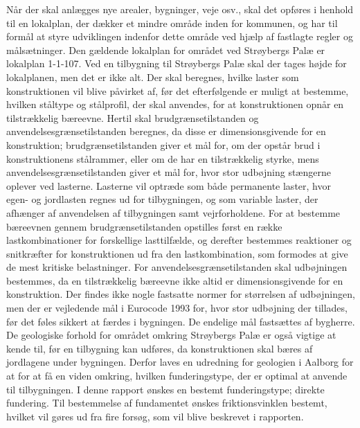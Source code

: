 \indent{     }  Når der skal anlægges nye arealer, bygninger, veje osv., skal det opføres i henhold til en lokalplan, der dækker et mindre område inden for kommunen, og har til formål at styre udviklingen indenfor dette område ved hjælp af fastlagte regler og målsætninger. Den gældende lokalplan for området ved Strøybergs Palæ er lokalplan 1-1-107.
\newline
\newline
Ved en tilbygning til Strøybergs Palæ skal der tages højde for lokalplanen, men det er ikke alt. Der skal beregnes, hvilke laster som konstruktionen vil blive påvirket af, før det efterfølgende er muligt at bestemme, hvilken ståltype og stålprofil, der skal anvendes, for at konstruktionen opnår en tilstrækkelig bæreevne. Hertil skal brudgrænsetilstanden og anvendelsesgrænsetilstanden beregnes, da disse er dimensionsgivende for en konstruktion; brudgrænsetilstanden giver et mål for, om der opstår brud i konstruktionens stålrammer, eller om de har en tilstrækkelig styrke, mens anvendelsesgrænsetilstanden giver et mål for, hvor stor udbøjning stængerne oplever ved lasterne. 
\newline \indent{     }  Lasterne vil optræde som både permanente laster, hvor egen- og jordlasten regnes ud for tilbygningen, og som variable laster, der afhænger af anvendelsen af tilbygningen samt vejrforholdene.
\newline \indent{     }  For at bestemme bæreevnen gennem brudgrænsetilstanden opstilles først en række lastkombinationer for forskellige lasttilfælde, og derefter bestemmes reaktioner og snitkræfter for konstruktionen ud fra den lastkombination, som formodes at give de mest kritiske belastninger. 
\newline \indent{     }  For anvendelsesgrænsetilstanden skal udbøjningen bestemmes, da en tilstrækkelig bæreevne ikke altid er dimensionsgivende for en konstruktion. Der findes ikke nogle fastsatte normer for størrelsen af udbøjningen, men der er vejledende mål i Eurocode 1993 for, hvor stor udbøjning der tillades, før det føles sikkert at færdes i bygningen. De endelige mål fastsættes af bygherre.
\newline
\newline
De geologiske forhold for området omkring Strøybergs Palæ er også vigtige at kende til, før en tilbygning kan udføres, da konstruktionen skal bæres af jordlagene under bygningen. Derfor laves en udredning for geologien i Aalborg for at for at få en viden omkring, hvilken funderingstype, der er optimal at anvende til tilbygningen. I denne rapport ønskes en bestemt funderingstype; direkte fundering. Til bestemmelse af fundamentet ønskes friktionsvinklen bestemt, hvilket vil gøres ud fra fire forsøg, som vil blive beskrevet i rapporten.